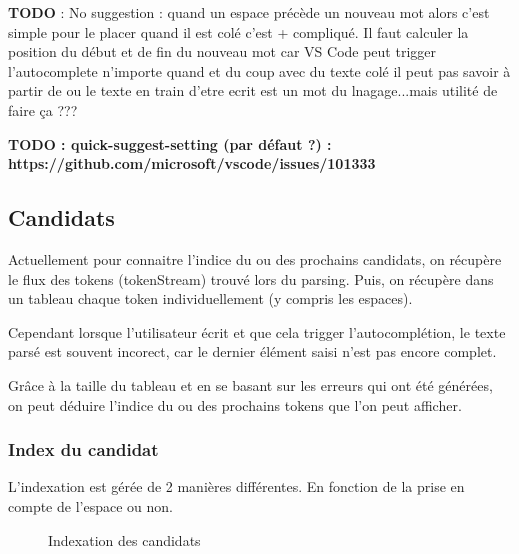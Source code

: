 \documentclass[
    iict, %
    il, %
]{heig-tb}
\begin{document}
\textbf{TODO} :
No suggestion :
quand un espace précède un nouveau mot alors c'est simple pour le placer
quand il est colé c'est + compliqué. Il faut calculer la position du début et de fin du nouveau mot car VS Code peut trigger l'autocomplete n'importe quand et du coup
avec du texte colé il peut pas savoir à partir de ou le texte en train d'etre ecrit est un mot du lnagage...mais utilité de faire ça ???

\textbf{TODO : quick-suggest-setting (par défaut ?) : https://github.com/microsoft/vscode/issues/101333}


\subsection{Candidats}\label{candidates}

Actuellement pour connaitre l'indice du ou des prochains candidats, on récupère le flux des tokens (tokenStream) trouvé lors du parsing.
Puis, on récupère dans un tableau chaque token individuellement (y compris les espaces).

Cependant lorsque l'utilisateur écrit et que cela trigger l'autocomplétion, le texte parsé est souvent incorect, car le dernier élément saisi n'est pas encore complet.

Grâce à la taille du tableau et en se basant sur les erreurs qui ont été générées, on peut déduire l'indice du ou des prochains tokens que l'on peut afficher.

\subsubsection{Index du candidat}
L'indexation est gérée de 2 manières différentes. En fonction de la prise en compte de l'espace ou non.

\begin{figure}[!h]
    \begin{center}
    \end{center}
    \caption[Indexation des candidats]{\label{candidat-index} Indexation des candidats}
\end{figure}
\end{document}
